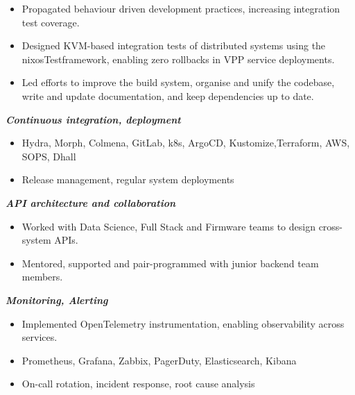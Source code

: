 \documentclass[11pt,a4paper,ngerman,sans]{moderncv}
\makeatletter
\newcommand{\addr}{\faIcon{map-pin} Winterthur, CH}
\newcommand{\natel}{\mobilephonesymbol\@mobile{<redacted>}}
\newcommand{\mail}{\emailsymbol\emaillink{marc@jakobi.dev}}
\newcommand{\github}{\href{https://github.com/mrcjkb}{\faIcon{github} mrcjkb}}
\newcommand{\website}{\href{https://mrcjkb.dev}{\faIcon{link} mrcjkb.dev}}
\newcommand{\linkedin}{\href{https://www.linkedin.com/in/marc-jakobi/}{\faIcon{linkedin} marc-jakobi}}
\newcommand{\footer}{\fancyfoot[C]{\footnotesize \addr\ \ \natel\ \ \mail\ \ \github\ \ \website\ \ \linkedin}}
\newcommand{\newpagewithfooter}{
\clearpage
\footer
}
\makeatother
\begin{document}
{\begin{adjustwidth}{\maincolumnindent}{\rightskip}
{\begin{itemize}
        \item Propagated behaviour driven development practices,
              increasing integration test coverage.
        \item Designed KVM-based integration tests of distributed systems
              using the nixosTest\newline framework,
              enabling zero rollbacks in VPP service deployments.
        \item Led efforts to improve the build system, organise and unify the codebase,
              write and update documentation, and keep dependencies up to date.
        \\
      \end{itemize}
      \textbf{\emph{Continuous integration, deployment}}
      \begin{itemize}
        \item Hydra, Morph, Colmena, GitLab, k8s, ArgoCD, Kustomize,\newline Terraform, AWS,
              SOPS, Dhall
        \item Release management, regular system deployments
        \\
      \end{itemize}
      \textbf{\emph{API architecture and collaboration}}
      \begin{itemize}
        \item Worked with Data Science, Full Stack and Firmware teams to design cross-system APIs.
        \item Mentored, supported and pair-programmed with junior backend team members.
        \\
      \end{itemize}
      \textbf{\emph{Monitoring, Alerting}}
      \begin{itemize}
        \item Implemented OpenTelemetry instrumentation, enabling observability across services.
        \item Prometheus, Grafana, Zabbix, PagerDuty, Elasticsearch, Kibana
        \item On-call rotation, incident response, root cause analysis
        \\
      \end{itemize}
    }
  \end{adjustwidth}
}

\end{document}
